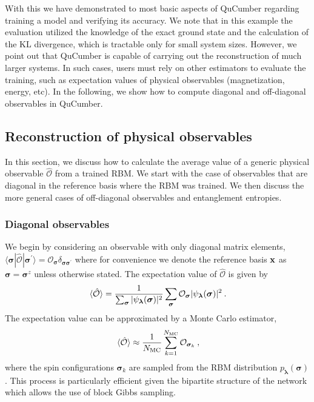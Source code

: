 \documentclass[submission, Phys, hidelnks]{SciPost}
\begin{document}
With this we have demonstrated to most basic aspects of QuCumber regarding
training a model and verifying its accuracy. We note that in this example the
evaluation utilized the knowledge of the exact ground state and the calculation
of the KL divergence, which is tractable only for small system sizes.  However,
we point out that QuCumber is capable of carrying out the reconstruction of much
larger systems. In such cases, users must rely on other estimators to evaluate
the training, such as expectation values of physical observables (magnetization,
energy, etc). In the following, we show how to compute diagonal and
off-diagonal observables in QuCumber.

\subsection{Reconstruction of physical observables}\label{Sec:Sampling_a-Trained_RBM}
In this section, we discuss how to calculate the average value of a generic
physical observable $\hat{\mathcal{O}}$ from a trained RBM.\@
We start with the case of observables that are diagonal in the reference basis
where the RBM was trained. We then discuss the more general cases of
off-diagonal observables and entanglement entropies.

\subsubsection{Diagonal observables}
We begin by considering an observable with only diagonal matrix elements,
$\langle\bm{\sigma}|\hat{\mathcal{O}}|\bm{\sigma}^{\prime}\rangle=\mathcal{O}_{\bm{\sigma}}\delta_{\bm{\sigma\sigma}^\prime}$
where for convenience we denote the reference basis ${\bf x}$ as
$\bm{\sigma}=\bm{\sigma}^z$ unless otherwise stated.
The expectation value of $\hat{\mathcal{O}}$ is given by
\begin{equation}
    \ev*{\hat{\mathcal{O}}} = \frac{1}{\sum_{\bm{\sigma}} |\psi_{\bm{\lambda}}(\bm{\sigma})|^2}
    \sum_{\bm{\sigma}} \mathcal{O}_{\bm{\sigma}}|\psi_{\bm{\lambda}}(\bm{\sigma})|^2\:.
\end{equation}
The expectation value can be approximated by a Monte Carlo estimator,
\begin{equation}
    \ev*{\hat{\mathcal{O}}} \approx \frac{1}{N_{\rm MC}} \sum_{k=1}^{N_{\rm MC}} \mathcal{O}_{\bm{\sigma}_k}\:,
\end{equation}
where the spin configurations $\bm{\sigma}_k$ are sampled from the RBM
distribution $p_{\bm{\lambda}}(\bm{\sigma})$. This process is particularly
efficient given the bipartite structure of the network which allows the use
of block Gibbs sampling.
\end{document}
